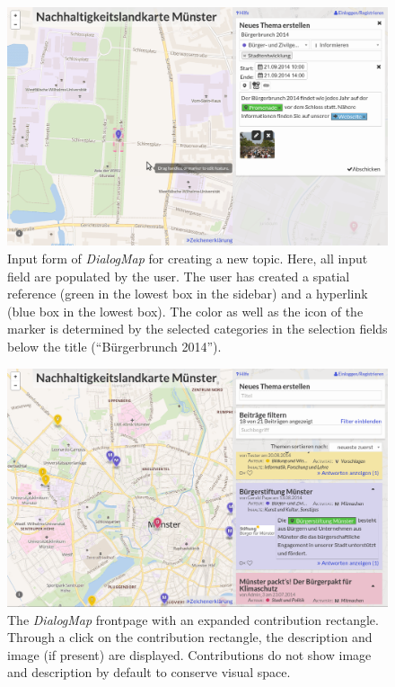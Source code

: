 \begin{figure}[!h]
    \centering
    \includegraphics[width=1\columnwidth]{images/screenshot_create}
    \caption{Input form of \textit{DialogMap} for creating a new topic. Here, all input field are populated by the user. The user has created a spatial reference (green in the lowest box in the sidebar) and a hyperlink (blue box in the lowest box). The color as well as the icon of the marker is determined by the selected categories in the selection fields below the title (``Bürgerbrunch 2014'').}
    \label{fig:screenshot_create}
\end{figure}

\begin{figure}[!h]
    \centering
    \includegraphics[width=1\columnwidth]{images/screenshot_expanded}
    \caption{The \textit{DialogMap} frontpage with an expanded contribution rectangle. Through a click on the contribution rectangle, the description and image (if present) are displayed. Contributions do not show image and description by default to conserve visual space.}
    \label{fig:screenshot_expanded}
\end{figure}

